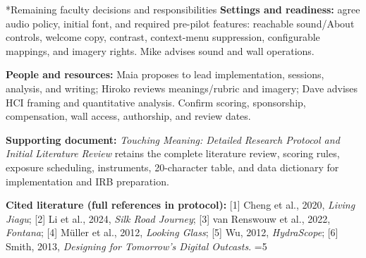 \documentclass[10pt,letterpaper]{article}
\makeatletter
\renewcommand\section{\@startsection{section}{1}{0pt}{8pt}{4pt}{\normalfont\large\bfseries}}
\makeatother
\begin{document}
\section*{Remaining faculty decisions and responsibilities}
\textbf{Settings and readiness:} agree audio policy, initial font, and required pre-pilot features: reachable sound/About controls, welcome copy, contrast, context-menu suppression, configurable mappings, and imagery rights. Mike advises sound and wall operations.

\textbf{People and resources:} Maia proposes to lead implementation, sessions, analysis, and writing; Hiroko reviews meanings/rubric and imagery; Dave advises HCI framing and quantitative analysis. Confirm scoring, sponsorship, compensation, wall access, authorship, and review dates.

\textbf{Supporting document:} \emph{Touching Meaning: Detailed Research Protocol and Initial Literature Review} retains the complete literature review, scoring rules, exposure scheduling, instruments, 20-character table, and data dictionary for implementation and IRB preparation.

{\footnotesize\textbf{Cited literature (full references in protocol):} [1] Cheng et al., 2020, \emph{Living Jiagu}; [2] Li et al., 2024, \emph{Silk Road Journey}; [3] van Renswouw et al., 2022, \emph{Fontana}; [4] M\"uller et al., 2012, \emph{Looking Glass}; [5] Wu, 2012, \emph{HydraScope}; [6] Smith, 2013, \emph{Designing for Tomorrow's Digital Outcasts}.}
\clearpage
\ifnum\value{page}=5\relax\else\PackageError{proposal-length}{Faculty proposal is not four pages}{Shorten overflowing content.}\fi
\end{document}
